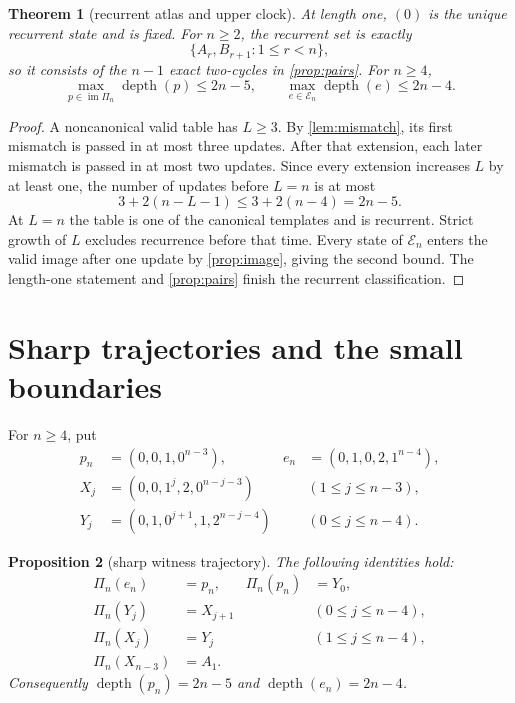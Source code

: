 \documentclass[10pt,a4paper]{amsart}
\newtheorem{theorem}{Theorem}[section]
\newtheorem{proposition}[theorem]{Proposition}
\theoremstyle{definition}
\theoremstyle{remark}
\newcommand{\En}{\mathcal E_n}
\newcommand{\depth}{\operatorname{depth}}
\newcommand{\im}{\operatorname{im}}
\begin{document}
\begin{theorem}[recurrent atlas and upper clock]\label{thm:upper}
At length one, $(0)$ is the unique recurrent state and is fixed.  For
$n\ge2$, the recurrent set is exactly
\[
                    \{A_r,B_{r+1}:1\le r<n\},
\]
so it consists of the $n-1$ exact two-cycles in \cref{prop:pairs}.  For
$n\ge4$,
\begin{equation}
 \max_{p\in\im\Pi_n}\depth(p)\le2n-5,\qquad
 \max_{e\in\En}\depth(e)\le2n-4.                    \label{eq:upper}
\end{equation}
\end{theorem}

\begin{proof}
A noncanonical valid table has $L\ge3$.  By
\cref{lem:mismatch}, its first mismatch is passed in at most three updates.
After that extension, each later mismatch is passed in at most two updates.
Since every extension increases $L$ by at least one, the number of updates
before $L=n$ is at most
\[
              3+2(n-L-1)\le3+2(n-4)=2n-5.            \label{eq:count}
\]
At $L=n$ the table is one of the canonical templates and is recurrent.
Strict growth of $L$ excludes recurrence before that time.  Every state of
$\En$ enters the valid image after one update by \cref{prop:image}, giving
the second bound.  The length-one statement and \cref{prop:pairs} finish the
recurrent classification.
\end{proof}

\section{Sharp trajectories and the small boundaries}

For $n\ge4$, put
\begin{align}
 p_n&=(0,0,1,0^{n-3}),& e_n&=(0,1,0,2,1^{n-4}),       \label{eq:witness}\\
 X_j&=(0,0,1^j,2,0^{n-j-3}) &&(1\le j\le n-3),       \label{eq:X}\\
 Y_j&=(0,1,0^{j+1},1,2^{n-j-4}) &&(0\le j\le n-4). \label{eq:Y}
\end{align}

\begin{proposition}[sharp witness trajectory]\label{prop:witness}
The following identities hold:
\begin{align}
 \Pi_n(e_n)&=p_n,& \Pi_n(p_n)&=Y_0,\label{eq:first}\\
 \Pi_n(Y_j)&=X_{j+1} &&(0\le j\le n-4),\label{eq:YtoX}\\
 \Pi_n(X_j)&=Y_j &&(1\le j\le n-4),\label{eq:XtoY}\\
 \Pi_n(X_{n-3})&=A_1.                                \label{eq:endpoint}
\end{align}
Consequently $\depth(p_n)=2n-5$ and $\depth(e_n)=2n-4$.
\end{proposition}
\end{document}

